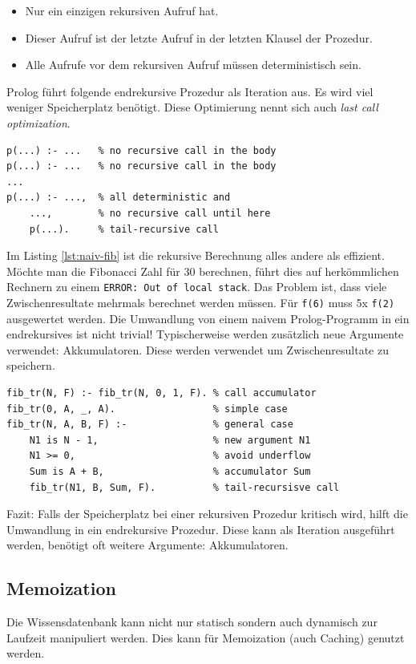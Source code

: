 \begin{itemize}
	\item Nur ein einzigen rekursiven Aufruf hat.
	\item Dieser Aufruf ist der letzte Aufruf in der letzten Klausel der Prozedur.
	\item Alle Aufrufe vor dem rekursiven Aufruf müssen deterministisch sein.
\end{itemize}

Prolog führt folgende endrekursive Prozedur als Iteration aus. Es wird viel weniger Speicherplatz benötigt. Diese Optimierung nennt sich auch \emph{last call optimization}.

\begin{lstlisting}[caption=Endrekursion: Allg. Beispiel]
p(...) :- ... 	% no recursive call in the body
p(...) :- ... 	% no recursive call in the body
...
p(...) :- ..., 	% all deterministic and
	..., 		% no recursive call until here
	p(...). 	% tail-recursive call
\end{lstlisting}

Im Listing \ref{lst:naiv-fib} ist die rekursive Berechnung alles andere als effizient. Möchte man die Fibonacci Zahl für 30 berechnen, führt dies auf herkömmlichen Rechnern zu einem \verb|ERROR: Out of local stack|. Das Problem ist, dass viele Zwischenresultate mehrmals berechnet werden müssen. Für \verb|f(6)| muss 5x \verb|f(2)| ausgewertet werden. Die Umwandlung von einem naivem Prolog-Programm in ein endrekursives ist nicht trivial! Typischerweise werden zusätzlich neue Argumente verwendet: Akkumulatoren. Diese werden verwendet um Zwischenresultate zu speichern.

\newpage

\begin{lstlisting}[caption=Endrekursive Fibonnaci-Berechnung]
fib_tr(N, F) :- fib_tr(N, 0, 1, F). % call accumulator
fib_tr(0, A, _, A). 				% simple case
fib_tr(N, A, B, F) :- 				% general case
	N1 is N - 1, 					% new argument N1
	N1 >= 0, 						% avoid underflow
	Sum is A + B,					% accumulator Sum
	fib_tr(N1, B, Sum, F). 			% tail-recursisve call
\end{lstlisting}

Fazit: Falls der Speicherplatz bei einer rekursiven Prozedur kritisch wird, hilft die Umwandlung in ein endrekursive Prozedur. Diese kann als Iteration ausgeführt werden, benötigt oft weitere Argumente: Akkumulatoren.

\subsection{Memoization}
Die Wissensdatenbank kann nicht nur statisch sondern auch dynamisch zur Laufzeit manipuliert werden. Dies kann für Memoization (auch Caching) genutzt werden.

